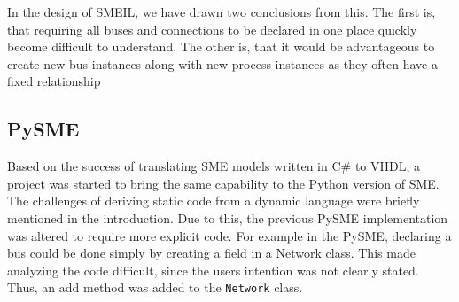 In the design of SMEIL, we have drawn
two conclusions from this. The first is, that requiring all buses and
connections to be declared in one place quickly become difficult to
understand. The other is, that it would be advantageous to create new bus
instances along with new process instances as they often have a fixed
relationship

\subsection{ PySME}
Based on the success of translating SME models written in C\# to VHDL, a project
was started to bring the same capability to the Python version of SME. The
challenges of deriving static code from a dynamic language were briefly
mentioned in the introduction. Due to this, the previous PySME implementation
was altered to require more explicit code. For example  in the
 PySME, declaring a bus could be done simply by creating a field in a
Network class. This made analyzing the code difficult, since the users intention
was not clearly stated. Thus, an {\ttfamily add} method was added to the
\texttt{Network} class.


